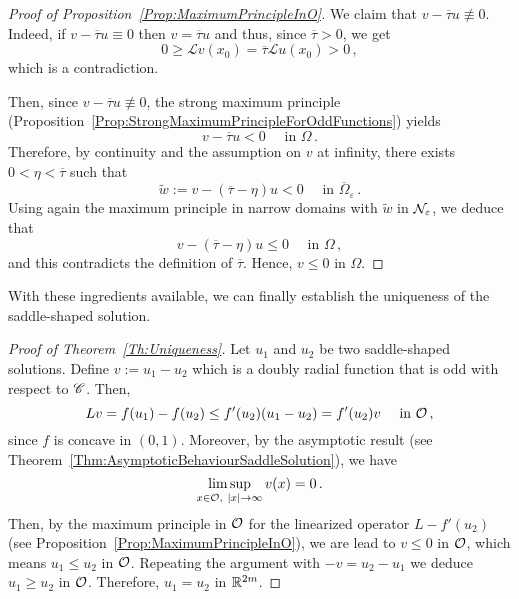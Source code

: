 \begin{proof}[Proof of Proposition~\ref{Prop:MaximumPrincipleInO}]
	We claim that $v - \overline{\tau} u \not \equiv 0$. Indeed, if $v - \overline{\tau} u \equiv 0$ then $v = \overline{\tau} u$ and thus, since $\overline{\tau} > 0$, we get
	$$
	0 \geq \mathscr{L} v(x_0) = \overline{\tau} \mathscr{L} u(x_0) > 0\,, 
	$$
	which is a contradiction.
	
	Then, since $v - \overline{\tau} u \not \equiv 0$, the strong maximum principle (Proposition~\ref{Prop:StrongMaximumPrincipleForOddFunctions}) yields
	$$
	v - \overline{\tau} u < 0 \quad \textrm{ in }\Omega\,.
	$$
	Therefore, by continuity and the assumption on $v$ at infinity, there exists $0 < \eta <\overline{\tau}$ such that 
	$$
	\tilde{w} := v - (\overline{\tau} - \eta) u < 0 \quad \textrm{ in }\overline{\Omega}_\varepsilon\,.
	$$
	Using again the maximum principle in narrow domains with $\tilde{w}$ in $\mathcal{N}_\varepsilon$, we deduce that 
	$$
	v - (\overline{\tau} - \eta) u \leq 0 \quad \textrm{ in }\Omega\,,
	$$
	and this contradicts the definition of $\overline{\tau}$. Hence, $v\leq 0$ in $\Omega$.
\end{proof}



With these ingredients available, we can finally establish the uniqueness of the saddle-shaped solution.



\begin{proof}[Proof of Theorem~\ref{Th:Uniqueness}]
	Let $u_1$ and $u_2$ be two saddle-shaped solutions. Define $v := u_1 - u_2$ which is a doubly radial function that is odd with respect to $\mathscr{C}$. Then,
	$$
	L v = f(u_1) - f(u_2) \leq f'(u_2) (u_1 - u_2) = f'(u_2) v \quad \textrm{ in } \mathcal{O}\,,
	$$
	since $f$ is concave in $(0,1)$. Moreover, by the asymptotic result (see Theorem~\ref{Thm:AsymptoticBehaviourSaddleSolution}), we have
	$$
	\limsup_{x\in \mathcal{O}, \ |x|\to \infty} v(x) = 0\,.
	$$
	Then, by the maximum principle in $\mathcal{O}$ for the linearized operator $L - f'(u_2)$ (see Proposition~\ref{Prop:MaximumPrincipleInO}), we are lead to $v \leq 0$ in $\mathcal{O}$, which means $u_1 \leq u_2$ in $\mathcal{O}$. Repeating the  argument with $-v = u_2 - u_1$ we deduce $u_1 \geq u_2$ in $\mathcal{O}$. Therefore, $u_1 = u_2$ in $\mathbb{R}^{2m}$.
\end{proof}


